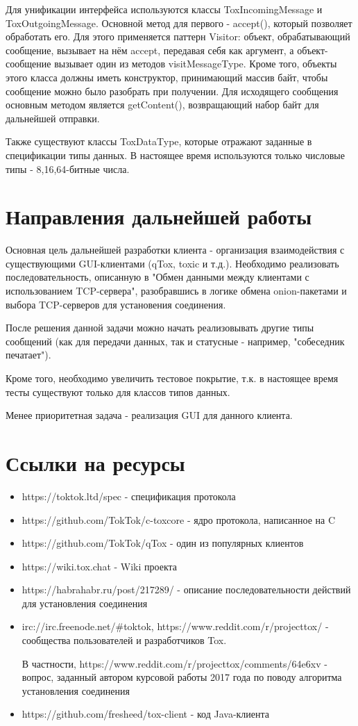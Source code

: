 \documentclass{/home/fresheed/utils/latex/university-templates/lab-report}
\begin{document}
Для унификации интерфейса используются классы ToxIncomingMessage и ToxOutgoingMessage. Основной метод для первого - accept(), который позволяет обработать его. Для этого применяется паттерн Visitor: объект, обрабатывающий сообщение, вызывает на нём accept, передавая себя как аргумент, а объект-сообщение вызывает один из методов visitMessageType. Кроме того, объекты этого класса должны иметь конструктор, принимающий массив байт, чтобы сообщение можно было разобрать при получении. Для исходящего сообщения основным методом является getContent(), возвращающий набор байт для дальнейшей отправки. 

Также существуют классы ToxDataType, которые отражают заданные в спецификации типы данных. В настоящее время используются только числовые типы - 8,16,64-битные числа.


\section{Направления дальнейшей работы}

Основная цель дальнейшей разработки клиента - организация взаимодействия с существующими GUI-клиентами (qTox, toxic и т.д.). Необходимо реализовать последовательность, описанную в "Обмен данными между клиентами с использованием TCP-сервера", разобравшись в логике обмена onion-пакетами и выбора TCP-серверов для установения соединения. 

После решения данной задачи можно начать реализовывать другие типы сообщений (как для передачи данных, так и статусные - например, "собеседник печатает").

Кроме того, необходимо увеличить тестовое покрытие, т.к. в настоящее время тесты существуют только для классов типов данных.

Менее приоритетная задача - реализация GUI для данного клиента.

\section{Ссылки на ресурсы}

\begin{itemize}
\item https://toktok.ltd/spec - спецификация протокола
\item https://github.com/TokTok/c-toxcore - ядро протокола, написанное на C
\item https://github.com/TokTok/qTox - один из популярных клиентов
\item https://wiki.tox.chat - Wiki проекта
\item https://habrahabr.ru/post/217289/ - описание последовательности действий для установления соединения
\item irc://irc.freenode.net/\#toktok, https://www.reddit.com/r/projecttox/ - сообщества пользователей и разработчиков Tox.

В частности, https://www.reddit.com/r/projecttox/comments/64e6xv - вопрос, заданный автором курсовой работы 2017 года по поводу алгоритма установления соединения
\item https://github.com/fresheed/tox-client - код Java-клиента
\end{itemize}
\end{document}
